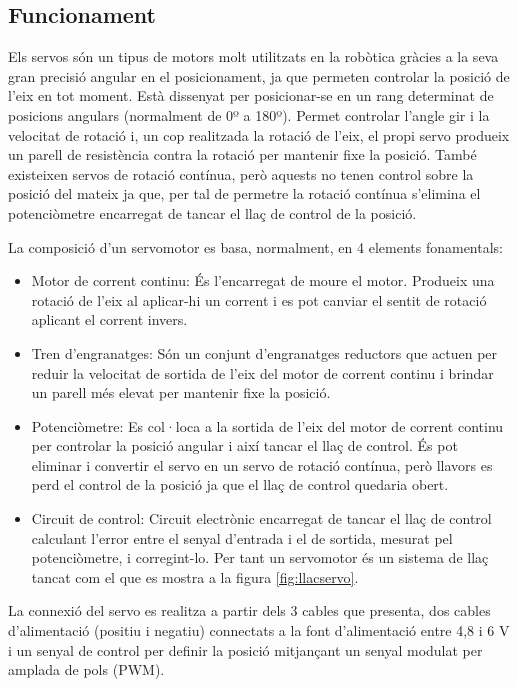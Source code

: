 \subsection{Funcionament}

Els servos són un tipus de motors molt utilitzats en la robòtica gràcies a la seva gran precisió  angular en el posicionament, ja que permeten controlar la posició de l’eix en tot moment. Està dissenyat per posicionar-se en un rang determinat de posicions angulars (normalment de 0º a 180º). Permet controlar l'angle gir i la velocitat de rotació i, un cop realitzada la rotació de l’eix, el propi servo produeix un parell de resistència contra la rotació per mantenir fixe la posició. També existeixen servos de rotació contínua, però aquests no tenen control sobre la posició del mateix ja que, per tal de permetre la rotació contínua s'elimina el potenciòmetre encarregat de tancar el llaç de control de la posició.

La composició d’un servomotor es basa, normalment, en 4 elements fonamentals: 
\begin{itemize}

	\item	Motor de corrent continu: És l’encarregat de moure el motor. Produeix una rotació de l’eix al aplicar-hi un corrent i es pot canviar el sentit de rotació aplicant el corrent invers.
	
	\item	Tren d’engranatges: Són un conjunt d’engranatges reductors que actuen per reduir la velocitat de sortida de l’eix del motor de corrent continu i brindar un parell més elevat per mantenir fixe la posició.
	
	\item	Potenciòmetre: Es col·loca a la sortida de l’eix del motor de corrent continu per controlar la posició angular i així tancar el llaç de control. És pot eliminar i convertir el servo en un servo de rotació contínua, però llavors es perd el control de la posició ja que el llaç de control quedaria obert.
	
	\item	Circuit de control:  Circuit electrònic encarregat de tancar el llaç de control calculant l'error entre el senyal d’entrada i el de sortida, mesurat pel potenciòmetre, i corregint-lo. Per tant un servomotor és un sistema de llaç tancat com el que es mostra a la figura \ref{fig:llacservo}. 
	
\end{itemize}

La connexió del servo es realitza a partir dels 3 cables que presenta, dos cables d'alimentació (positiu i negatiu) connectats a la font d’alimentació entre 4,8 i 6 V i un senyal de control per definir la posició mitjançant un senyal modulat per amplada de pols (PWM).

